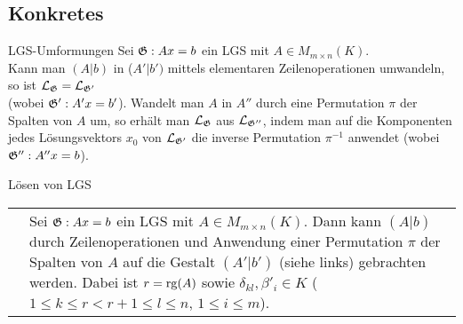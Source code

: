 \pagebreak

\subsection{%
    Konkretes%
}

\begin{Satz}{LGS-Umformungen}
    Sei $\mathfrak{G}: Ax = b$ ein LGS mit $A \in M_{m \times n}(K)$. \\
    Kann man $(A|b)$ in ($A'|b')$ mittels elementaren Zeilenoperationen
    umwandeln, so ist $\mathcal{L}_{\mathfrak{G}} = \mathcal{L}_{\mathfrak{G'}}$ \\
    (wobei $\mathfrak{G'}: A'x = b'$).
    Wandelt man $A$ in $A''$ durch eine Permutation $\pi$ der Spalten von $A$
    um, so erhält man $\mathcal{L}_{\mathfrak{G}}$ aus $\mathcal{L}_{\mathfrak{G''}}$, indem man auf die
    Komponenten jedes Lösungsvektors $x_0$ von $\mathcal{L}_{\mathfrak{G'}}$ die inverse
    Permutation $\pi^{-1}$ anwendet (wobei $\mathfrak{G''}: A''x = b$).
\end{Satz}

\begin{Satz}{Lösen von LGS} \\
    \begin{tabular}{p{6.8cm}p{9.2cm}}
    \matrixsize{$\left(\begin{array}{ccccccc|c}
    1 & 0 & \cdots & 0 &
    \delta_{1, r+1} & \cdots & \delta_{1, n} & \beta'_1 \\
    0 & 1 & \cdots & 0 &
    \delta_{2, r+1} & \cdots & \delta_{2, n} & \beta'_2 \\
    \vdots & \vdots & \ddots & \vdots & \vdots & & \vdots & \vdots \\
    0 & 0 & \cdots & 1 &
    \delta_{r, r+1} & \cdots & \delta_{r, n} & \beta'_r \\
    0 & 0 & \cdots & 0 & 0 & \cdots & 0 & \beta'_{r+1} \\
    \vdots & \vdots & & \vdots & \vdots & & \vdots & \vdots \\
    0 & 0 & \cdots & 0 & 0 & \cdots & 0 & \beta'_m \end{array}\right)$}
    &
    \begin{minipage}[c]{9.2cm}
    Sei $\mathfrak{G}: Ax = b$ ein LGS mit $A \in M_{m \times n}(K)$.
    Dann kann $(A|b)$ durch Zeilenoperationen und Anwendung einer Permutation
    $\pi$ der Spalten von $A$ auf die Gestalt $(A'|b')$ (siehe links)
    gebrachten werden.
    Dabei ist $r = \operatorname{rg}(A)$ sowie $\delta_{kl}, \beta'_i \in K$
    ($1 \le k \le r < r+1 \le l \le n$, $1 \le i \le m$).
    \end{minipage}\end{tabular}
\end{Satz}

